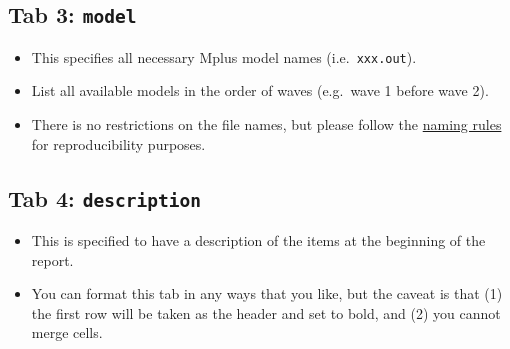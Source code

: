 \documentclass[
]{book}
\begin{document}
\hypertarget{tab-3-model}{%
\subsection{\texorpdfstring{Tab 3: \texttt{model}}{Tab 3: model}}\label{tab-3-model}}

\begin{itemize}
\item
  This specifies all necessary Mplus model names (i.e.~\texttt{xxx.out}).
\item
  List all available models in the order of waves (e.g.~wave 1 before wave 2).
\item
  There is no restrictions on the file names, but please follow the \href{https://nyu.box.com/s/ate5l7wmw164u7xjg3g8x1vrfhwnt0ax}{naming rules} for reproducibility purposes.
\end{itemize}

\hypertarget{tab-4-description}{%
\subsection{\texorpdfstring{Tab 4: \texttt{description}}{Tab 4: description}}\label{tab-4-description}}

\begin{itemize}
\item
  This is specified to have a description of the items at the beginning of the report.
\item
  You can format this tab in any ways that you like, but the caveat is that (1) the first row will be taken as the header and set to bold, and (2) you cannot merge cells.
\end{itemize}
\end{document}
